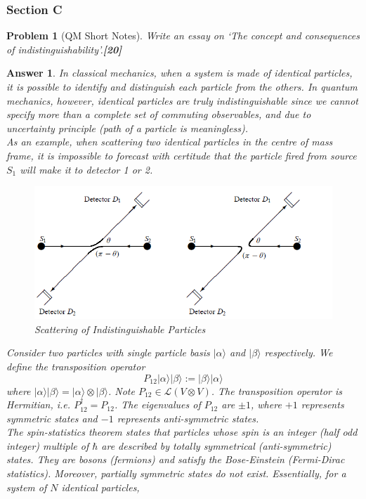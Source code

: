 \documentclass[a4paper]{article}
\newtheorem{ans}{Answer}[subsection]
\theoremstyle{new}
\newtheorem{qns}{Problem}[subsection]
\begin{document}
\subsubsection{Section C}
\begin{qns}[QM Short Notes]
Write an essay on `The concept and consequences of indistinguishability'.\hfill\textbf{[20]}
\end{qns}
\begin{ans}
In classical mechanics, when a system is made of identical particles, it is possible to identify and distinguish each particle from the others. In quantum mechanics, however, identical particles are truly indistinguishable since we cannot specify more than a complete set of commuting observables, and due to uncertainty principle (path of a particle is meaningless).\\[5pt]
As an example, when scattering two identical particles in the centre of mass frame, it is impossible to forecast with certitude that the particle fired from source $S_1$ will make it to detector 1 or 2. 
\begin{figure}[H]
    \centering
    \includegraphics[width=\linewidth]{indistinguishable.PNG}
    \caption{Scattering of Indistinguishable Particles}
\end{figure}
Consider two particles with single particle basis $|\alpha\rangle$ and $|\beta\rangle$ respectively. We define the transposition operator
$$P_{12}|\alpha\rangle|\beta\rangle:=|\beta\rangle|\alpha\rangle$$
where $|\alpha\rangle|\beta\rangle=|\alpha\rangle\otimes|\beta\rangle$. Note $P_{12}\in\mathcal{L}(V\otimes V)$. The transposition operator is Hermitian, i.e. $P_{12}^\dag=P_{12}$. The eigenvalues of $P_{12}$ are $\pm1$, where $+1$ represents symmetric states and $-1$ represents anti-symmetric states.\\[5pt]
The spin-statistics theorem states that particles whose spin is an integer (half odd integer) multiple of $\hbar$ are described by totally symmetrical (anti-symmetric) states. They are bosons (fermions) and satisfy the Bose-Einstein (Fermi-Dirac statistics). Moreover, partially symmetric states do not exist. Essentially, for a system of $N$ identical particles,

\end{ans}
\end{document}
